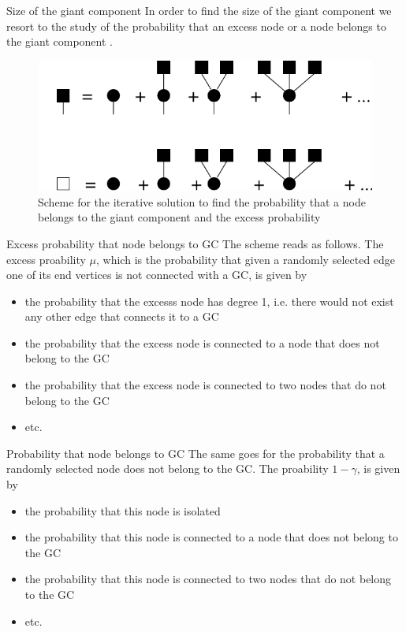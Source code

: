 \documentclass[handout]{beamer}
\begin{document}
\begin{frame}{Size of the giant component}
    In order to find the size of the giant component we resort to the study of
    the probability that an excess node or a node belongs to the giant
    component \cite[56]{weigt}.

    \begin{figure}
        \centering
        \includegraphics[width=.6\textwidth]{PTCOP_iterative}
        \caption{Scheme for the iterative solution to find the probability that
        a node belongs to the giant component and the excess probability}
        \label{fig:iterative}
    \end{figure}
\end{frame}

\begin{frame}{Excess probability that node belongs to GC}
    The scheme reads as follows. The excess proability $\mu$, which is
    the probability that given a randomly selected edge one of its end vertices
    is not connected with a GC, is given by
    \begin{itemize}
        \item the probability that the excesss node has degree 1, i.e. there
            would not exist any other edge that connects it to a GC
        \item the probability that the excess node is connected to a node that
            does not belong to the GC
        \item the probability that the excess node is connected to two nodes
            that do not belong to the GC
        \item etc.
    \end{itemize}
\end{frame}

\begin{frame}{Probability that node belongs to GC}
    The same goes for the probability that a randomly selected node does not
    belong to the GC. The proability $1-\gamma$, is given by
    \begin{itemize}
        \item the probability that this node is isolated
        \item the probability that this node is connected to a node that does
            not belong to the GC
        \item the probability that this node is connected to two nodes that do
            not belong to the GC
        \item etc.
    \end{itemize}
\end{frame}
\end{document}
